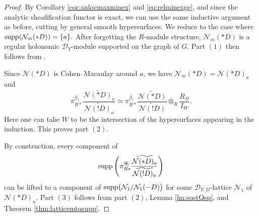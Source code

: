 \documentclass{amsart}
\theoremstyle{plain}
\numberwithin{theorem}{section}
\theoremstyle{definition}
\theoremstyle{remark}
\theoremstyle{definition}
\newcommand{\wt}{\widetilde}
\newcommand{\cN}{\mathcal{N}}
\newcommand{\sG}{\mathscr{G}}
\newcommand{\shD}{\mathscr{D}}
\newcommand{\supp}{\textup{supp}}
\begin{document}
\begin{proof}
By Corollary \ref{cor:anlocmaxminex} and \eqref{eq:relminexge}, and since the
analytic sheafification functor is exact, we can use the same inductive
argument as before, cutting by general smooth hypersurfaces. We reduce to the
case where
$\supp(\cN_m(*D))=\{a\}.$
After forgetting the $R$-module structure, $\cN_m(*D)$ is a regular holonomic
$\shD_Y$-module supported on the graph of $G$. Part $(1)$ then follows from
\cite[Cor.1.3 and Thm.1.4]{WuRHA}.

Since $\cN(*D)$ is Cohen--Macaulay around $a$, we have
$\cN_m(*D)=\cN(*D)_a$
and
\[
\pi_{R*}^{\sG_l}
\frac{\wt{\cN(*D)_a}}{\wt{\cN(!D)_a}}
\simeq
\pi_{R*}^{\sG_l}
\frac{\wt{\cN(*D)}}{\wt{\cN(!D)}}
\otimes_R
\frac{R_\Omega}{I_W}.
\]
Here one can take $W$ to be the intersection of the hypersurfaces appearing
in the induction. This proves part $(2)$.

By construction, every component of
\[
\supp
\left(
\pi_{R*}^{\sG_l}
\frac{\wt{\cN(*D)_a}}{\wt{\cN(!D)_a}}
\right)
\]
can be lifted to a component of
$\supp\big(\cN_1/\cN_1(-D)\big)$
for some $\shD_{Y,D}$-lattice $\cN_1$ of $\cN(*D)_a$. Part $(3)$ follows
from part $(2)$, Lemma \ref{lm:sqstQsp}, and
Theorem \ref{thm:latticemtqsupp}.
\end{proof}
\end{document}
